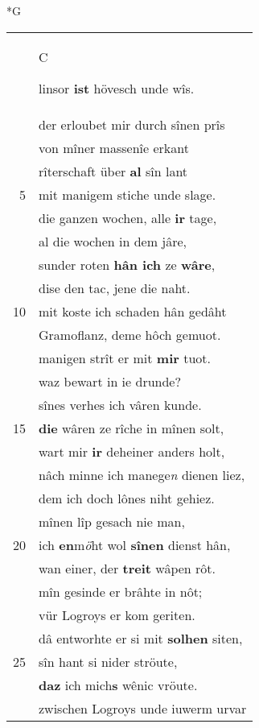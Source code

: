 \documentclass[8pt,a4paper,notitlepage]{article}
\begin{document}
\newpage
\begin{table}[ht]
\begin{minipage}[t]{0.5\linewidth}
\small
\begin{center}*G
\end{center}
\begin{tabular}{rl}
 & \begin{large}C\end{large}linsor \textbf{ist} hövesch unde wîs.\\ 
 & der erloubet mir durch sînen prîs\\ 
 & von mîner massenîe erkant\\ 
 & rîterschaft über \textbf{al} sîn lant\\ 
5 & mit manigem stiche unde slage.\\ 
 & die ganzen wochen, alle \textbf{ir} tage,\\ 
 & al die wochen in dem jâre,\\ 
 & sunder roten \textbf{hân ich} ze \textbf{wâre},\\ 
 & dise den tac, jene die naht.\\ 
10 & mit koste ich schaden hân gedâht\\ 
 & Gramoflanz, deme hôch gemuot.\\ 
 & manigen strît er mit \textbf{mir} tuot.\\ 
 & waz bewart in ie drunde?\\ 
 & sînes verhes ich vâren kunde.\\ 
15 & \textbf{die} wâren ze rîche in mînen solt,\\ 
 & wart mir \textbf{ir} deheiner anders holt,\\ 
 & nâch minne ich manege\textit{n} dienen liez,\\ 
 & dem ich doch lônes niht gehiez.\\ 
 & mînen lîp gesach nie man,\\ 
20 & ich \textbf{en}m\textit{ö}ht wol \textbf{sînen} dienst hân,\\ 
 & wan einer, der \textbf{treit} wâpen rôt.\\ 
 & mîn gesinde er brâhte in nôt;\\ 
 & vür Logroys er kom geriten.\\ 
 & dâ entworhte er si mit \textbf{solhen} siten,\\ 
25 & sîn hant si nider ströute,\\ 
 & \textbf{daz} ich mich\textbf{s} wênic vröute.\\ 
 & zwischen Logroys unde iuwerm urvar\\ 

\end{tabular}
\end{minipage}
\end{table}
\end{document}
